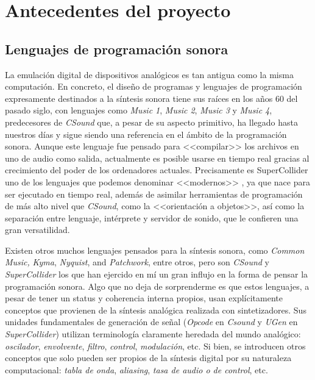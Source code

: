 \chapter[Antecedentes del proyecto]{Antecedentes del proyecto}
\label{ch:antecedentes}

\section{Lenguajes de programación sonora}

La emulación digital de dispositivos analógicos es tan antigua como la misma computación. En concreto, el diseño de programas y lenguajes de programación expresamente destinados a la síntesis sonora tiene sus raíces  en los años 60 del pasado siglo, con lenguajes como \textit{Music 1}, \textit{Music 2}, \textit{Music 3} y \textit{Music 4}, predecesores de \textit{CSound} \cite[~p. xxvii]{Csound_book} que, a pesar de su aspecto primitivo, ha llegado hasta nuestros días y sigue siendo una referencia en el ámbito de la programación sonora. Aunque este lenguaje fue pensado para <<compilar>> los archivos en uno de audio como salida, actualmente es posible usarse en tiempo real gracias al crecimiento del poder de los ordenadores actuales. Precisamente es SuperCollider uno de los  lenguajes que podemos denominar <<modernos>> \cite[~p. ix]{SC_book}, ya que nace para ser ejecutado en tiempo real, además de asimilar herramientas de programación de más alto nivel que \textit{CSound}, como la <<orientación a objetos>>, así como la separación entre lenguaje, intérprete y servidor de sonido, que le confieren una gran versatilidad. 




Existen otros muchos lenguajes pensados para la síntesis sonora, como \textit{Common Music,} \textit{Kyma}, \textit{Nyquist}, and \textit{Patchwork}, entre otros, pero son \textit{CSound} y \textit{SuperCollider} los que han ejercido en mí un gran influjo en la forma de pensar la programación sonora. Algo que no deja de sorprenderme es que estos lenguajes, a pesar de tener un status y coherencia interna propios, usan explícitamente conceptos que provienen de la síntesis analógica realizada con sintetizadores. Sus unidades fundamentales de generación de señal (\textit{Opcode} en \textit{Csound} y \textit{UGen} en \textit{SuperCollider}) utilizan terminología claramente heredada del mundo analógico: \textit{oscilador}, \textit{envolvente}, \textit{filtro}, \textit{control}, \textit{modulación}, etc. Si bien, se introducen otros conceptos que solo pueden ser propios de la síntesis digital por su naturaleza computacional: \textit{tabla de onda}, \textit{aliasing}, \textit{tasa de audio o de control}, etc.

